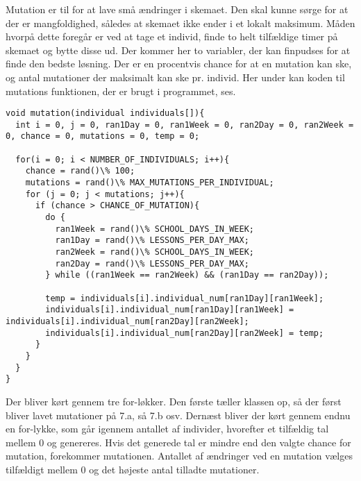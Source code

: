 Mutation er til for at lave små ændringer i skemaet. Den skal kunne sørge for at der er mangfoldighed, således at skemaet ikke ender i et lokalt maksimum. 
Måden hvorpå dette foregår er ved at tage et individ, finde to helt tilfældige timer på skemaet og bytte disse ud. Der kommer her to variabler, der kan finpudses for at finde den bedste løsning. Der er en procentvis chance for at en mutation kan ske, og antal mutationer der maksimalt kan ske pr. individ. 
Her under kan koden til mutations funktionen, der er brugt i programmet, ses.
\begin{lstlisting}
void mutation(individual individuals[]){
  int i = 0, j = 0, ran1Day = 0, ran1Week = 0, ran2Day = 0, ran2Week = 0, chance = 0, mutations = 0, temp = 0;

  for(i = 0; i < NUMBER_OF_INDIVIDUALS; i++){
    chance = rand()\% 100;
    mutations = rand()\% MAX_MUTATIONS_PER_INDIVIDUAL;
    for (j = 0; j < mutations; j++){
      if (chance > CHANCE_OF_MUTATION){
        do {
          ran1Week = rand()\% SCHOOL_DAYS_IN_WEEK;
          ran1Day = rand()\% LESSONS_PER_DAY_MAX;
          ran2Week = rand()\% SCHOOL_DAYS_IN_WEEK;
          ran2Day = rand()\% LESSONS_PER_DAY_MAX;
        } while ((ran1Week == ran2Week) && (ran1Day == ran2Day));
        
        temp = individuals[i].individual_num[ran1Day][ran1Week];
        individuals[i].individual_num[ran1Day][ran1Week] =        individuals[i].individual_num[ran2Day][ran2Week];
        individuals[i].individual_num[ran2Day][ran2Week] = temp;
      }
    }
  }
}
\end{lstlisting}

Der bliver kørt gennem tre for-løkker. Den første tæller klassen op, så der først bliver lavet mutationer på 7.a, så 7.b osv. Dernæst bliver der kørt gennem endnu en for-lykke, som går igennem antallet af individer, hvorefter et tilfældig tal mellem 0 og genereres. Hvis det generede tal er mindre end den valgte chance for mutation, forekommer mutationen. Antallet af ændringer ved en mutation vælges tilfældigt mellem 0 og det højeste antal tilladte mutationer.